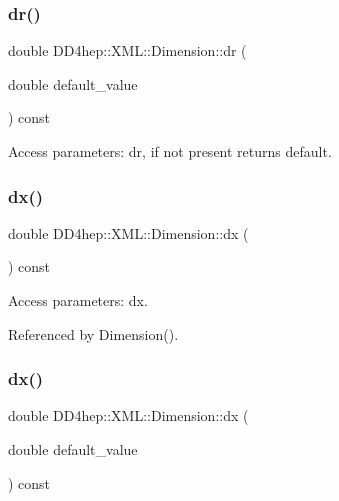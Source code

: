 \subsubsection{\texorpdfstring{dr()}{dr()}\hspace{0.1cm}{\footnotesize\ttfamily [2/2]}}
{\footnotesize\ttfamily double D\+D4hep\+::\+X\+M\+L\+::\+Dimension\+::dr (\begin{DoxyParamCaption}\item[{double}]{default\+\_\+value }\end{DoxyParamCaption}) const}



Access parameters\+: dr, if not present returns default. 

\hypertarget{struct_d_d4hep_1_1_x_m_l_1_1_dimension_a61a21c1ac44a060a34c0c918ca999197}{}\label{struct_d_d4hep_1_1_x_m_l_1_1_dimension_a61a21c1ac44a060a34c0c918ca999197} 
\subsubsection{\texorpdfstring{dx()}{dx()}\hspace{0.1cm}{\footnotesize\ttfamily [1/2]}}
{\footnotesize\ttfamily double D\+D4hep\+::\+X\+M\+L\+::\+Dimension\+::dx (\begin{DoxyParamCaption}{ }\end{DoxyParamCaption}) const}



Access parameters\+: dx. 



Referenced by Dimension().

\hypertarget{struct_d_d4hep_1_1_x_m_l_1_1_dimension_aa305c414a6a91d0901fcdfc14793bc42}{}\label{struct_d_d4hep_1_1_x_m_l_1_1_dimension_aa305c414a6a91d0901fcdfc14793bc42} 
\subsubsection{\texorpdfstring{dx()}{dx()}\hspace{0.1cm}{\footnotesize\ttfamily [2/2]}}
{\footnotesize\ttfamily double D\+D4hep\+::\+X\+M\+L\+::\+Dimension\+::dx (\begin{DoxyParamCaption}\item[{double}]{default\+\_\+value }\end{DoxyParamCaption}) const}



